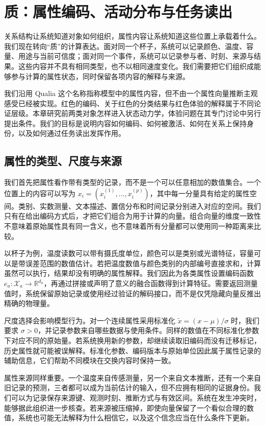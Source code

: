 \chapter{质：属性编码、活动分布与任务读出}
\label{chp:qualia_activation}

关系结构让系统知道对象如何组织，属性内容让系统知道这些位置上承载着什么。我们现在转向“质”的计算表达。面对同一个杯子，系统可以记录颜色、温度、容量、用途与当前可信度；面对同一个事件，系统可以记录参与者、时刻、来源与结果。这些内容并不具有相同类型，也不以相同速度变化。我们需要把它们组织成能够参与计算的属性状态，同时保留各项内容的解释与来源。

我们沿用 Qualia 这个名称指称模型中的属性内容，但不由一个属性向量推断主观感受已经被实现。红色的编码、关于红色的分类结果与红色体验的解释属于不同论证层级。本章研究前两类对象怎样进入状态动力学，体验问题在其专门讨论中另行提出条件。我们的目标是说明内容如何编码、如何被激活、如何在关系上保持身份，以及如何通过任务读出发挥作用。

\section{属性的类型、尺度与来源}
\label{sec:qualia_definition}

我们首先把属性看作带有类型的记录，而不是一个可以任意相加的数值集合。一个位置上的内容可以写为 $x_i=(x_i^{(1)},\ldots,x_i^{(p)})$，其中每一分量具有给定的属性空间。类别、实数测量、文本描述、置信分布和时间记录分别进入对应的空间。我们只有在给出编码方式后，才把它们组合为用于计算的向量。组合向量的维度一致性不意味着原始属性具有同一含义，也不意味着所有分量都可以使用同一种距离来比较。

以杯子为例，温度读数可以带有摄氏度单位，颜色可以是类别或光谱特征，容量可以是带误差范围的数值估计。若把温度数值与颜色类别的内部编号直接求和，计算虽然可以执行，结果却没有明确的属性解释。我们因此为各类属性设置编码函数 $e_a:\mathcal X_a\to\mathbb{R}^{d_a}$，再通过拼接或声明了意义的融合函数得到计算特征。需要返回测量值时，系统保留原始记录或使用经过验证的解码接口，而不是仅凭隐藏向量反推出精确的物理量。

尺度选择会影响模型行为。对一个连续属性采用标准化 $\widetilde x=(x-\mu)/\sigma$ 时，我们要求 $\sigma>0$，并记录参数来自哪些数据与使用条件。同样的数值在不同标准化参数下对应不同的原始量。若系统换用新的参数，却继续读取旧编码而没有迁移标记，历史属性就可能被误解释。标准化参数、编码版本与原始单位因此属于属性记录的辅助信息，它们帮助不同模块在交换内容时保持一致。

属性来源同样重要。一个温度来自传感测量，另一个来自文本推断，还有一个来自旧记录的预测，三者都可以成为当前估计的输入，但不应拥有相同的证据身份。我们可以为记录保存来源键、观测时刻、推断方式与有效区间。系统在发生冲突时，能够据此组织进一步核查。若来源被压缩掉，即使向量保留了一个看似合理的数值，系统也可能无法解释为什么相信它，以及这个信念应当在什么条件下更新。

